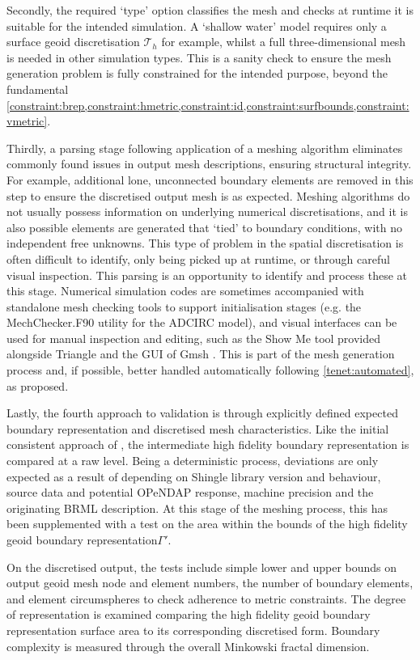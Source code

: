 \documentclass[a4paper, 10pt]{book}
\providecommand{\shingle}{Shingle\xspace}
\providecommand{\opendap}{OPeNDAP\xspace}
\providecommand{\brml}{BRML\xspace}
\providecommand{\brep}{boundary representation\xspace}
\providecommand{\threed}{three-dimensional\xspace}
\newcommand{\constraints}{\cref{constraint:brep,constraint:hmetric,constraint:id,constraint:surfbounds,constraint:vmetric}\xspace}
\begin{document}
Secondly, the required `type' option classifies the mesh and checks at runtime it is suitable for the intended simulation.
%
A `shallow water' model requires only a surface geoid discretisation
$\mathcal{T}_h$ for example, whilst a full \threed mesh is needed in other simulation types.
%
This is a sanity check to ensure the mesh generation problem is fully constrained for the intended purpose, beyond the fundamental \constraints.

Thirdly, a parsing stage following application of a meshing algorithm eliminates commonly found issues in output mesh descriptions,
%
ensuring structural integrity.
%
For example, additional lone, unconnected boundary elements are removed in this step to ensure the discretised output mesh is as expected.
%
Meshing algorithms do not usually possess information on underlying numerical discretisations, and it is also possible elements are generated that `tied' to boundary conditions, with no independent free unknowns.
This type of problem in the spatial discretisation is often difficult to identify, only being picked up at runtime, or through careful visual inspection.
This parsing is an opportunity to identify and process these at this stage.
%
Numerical simulation codes are sometimes accompanied with standalone mesh checking tools to support initialisation stages
(e.g. the MechChecker.F90 utility for the ADCIRC model),
and visual interfaces can be used for manual inspection and editing,
such as the Show Me tool provided alongside Triangle \citep{triangle} and the GUI of Gmsh \citep{gmsh}.
This is part of the mesh generation process and,
if possible, better handled automatically following \cref{tenet:automated}, as proposed.

Lastly, the fourth approach to validation is through explicitly defined
expected boundary representation and discretised mesh characteristics.
%
Like the initial consistent approach of \cite{candybrep}, the intermediate high fidelity
boundary representation is compared at a raw level.
%
Being a deterministic process, deviations are only expected as a result of
%
depending on \shingle library version and behaviour, source data and potential \opendap response, machine precision and the originating \brml description.
%
At this stage of the meshing process, this has been supplemented with a test on the area within the bounds of the high fidelity geoid \brep $\Gamma'$.
%


On the discretised output, the tests include 
simple
lower and upper
bounds on output geoid mesh node and element numbers,
the number of boundary elements,
and element circumspheres to check 
adherence to metric constraints.
%
The degree of representation is examined comparing the high fidelity geoid \brep surface area to its corresponding discretised form.
Boundary complexity is measured through the overall Minkowski fractal dimension.
\end{document}
